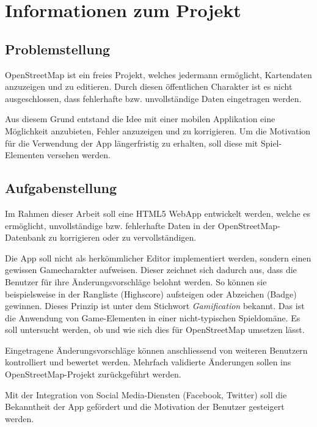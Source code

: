 \chapter{Informationen zum Projekt}
\label{informationen-projekt}


\section{Problemstellung}
OpenStreetMap ist ein freies Projekt, welches jedermann ermöglicht, Kartendaten anzuzeigen und zu editieren.
Durch diesen öffentlichen Charakter ist es nicht ausgeschlossen, dass fehlerhafte bzw. unvollständige Daten eingetragen werden.

Aus diesem Grund entstand die Idee mit einer mobilen Applikation eine Möglichkeit anzubieten, Fehler anzuzeigen und zu korrigieren.
Um die Motivation für die Verwendung der App längerfristig zu erhalten, soll diese mit Spiel-Elementen versehen werden.

\section{Aufgabenstellung}
Im Rahmen dieser Arbeit soll eine HTML5 \gls{WebApp} entwickelt werden, welche es ermöglicht, unvollständige bzw. fehlerhafte Daten in der OpenStreetMap-Datenbank zu korrigieren oder zu vervollständigen.

Die App soll nicht als herkömmlicher Editor implementiert werden, sondern einen gewissen Gamecharakter aufweisen.
Dieser zeichnet sich dadurch aus, dass die Benutzer für ihre Änderungsvorschläge belohnt werden.
So können sie beispielsweise in der Rangliste (Highscore) aufsteigen oder Abzeichen (Badge) gewinnen.
Dieses Prinzip ist unter dem Stichwort \emph{Gamification} bekannt.
Das ist die Anwendung von Game-Elementen in einer nicht-typischen Spieldomäne.
Es soll untersucht werden, ob und wie sich dies für OpenStreetMap umsetzen lässt.

Eingetragene Änderungsvorschläge können anschliessend von weiteren Benutzern kontrolliert und bewertet werden.
Mehrfach validierte Änderungen sollen ins OpenStreetMap-Projekt zurückgeführt werden.

Mit der Integration von Social Media-Diensten (Facebook, Twitter) soll die Bekanntheit der App gefördert und die Motivation der Benutzer gesteigert werden.

